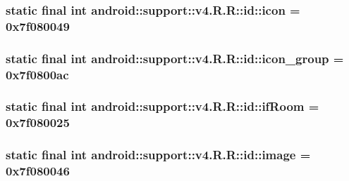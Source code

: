 \hypertarget{classandroid_1_1support_1_1v4_1_1_r_1_1id_f3896871e9a6d511f5b9f275def88af1}{
\subsubsection[{icon}]{\setlength{\rightskip}{0pt plus 5cm}static final int android::support::v4.R.R::id::icon = 0x7f080049}}
\label{classandroid_1_1support_1_1v4_1_1_r_1_1id_f3896871e9a6d511f5b9f275def88af1}


\hypertarget{classandroid_1_1support_1_1v4_1_1_r_1_1id_20b7a1899a0366f55c6f1f1aebedc341}{
\subsubsection[{icon\_\-group}]{\setlength{\rightskip}{0pt plus 5cm}static final int android::support::v4.R.R::id::icon\_\-group = 0x7f0800ac}}
\label{classandroid_1_1support_1_1v4_1_1_r_1_1id_20b7a1899a0366f55c6f1f1aebedc341}


\hypertarget{classandroid_1_1support_1_1v4_1_1_r_1_1id_9f3b405ace534a295de94805d7bf942b}{
\subsubsection[{ifRoom}]{\setlength{\rightskip}{0pt plus 5cm}static final int android::support::v4.R.R::id::ifRoom = 0x7f080025}}
\label{classandroid_1_1support_1_1v4_1_1_r_1_1id_9f3b405ace534a295de94805d7bf942b}


\hypertarget{classandroid_1_1support_1_1v4_1_1_r_1_1id_e89befc7dffa109698e6e4aea51c4e7e}{
\subsubsection[{image}]{\setlength{\rightskip}{0pt plus 5cm}static final int android::support::v4.R.R::id::image = 0x7f080046}}
\label{classandroid_1_1support_1_1v4_1_1_r_1_1id_e89befc7dffa109698e6e4aea51c4e7e}


